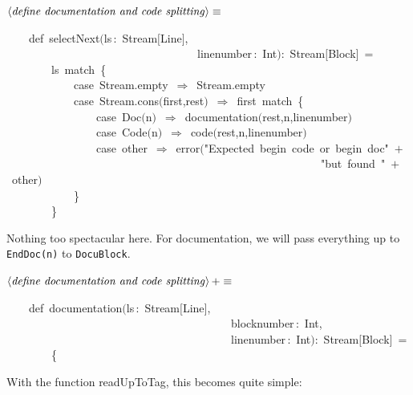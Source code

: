 \documentclass[a4paper,12pt]{article}
\begin{document}
$\left<\mbox{\emph{define documentation and code splitting}}\right>\equiv$
\begin{program}~~~~{\vem def}~selectNext$($ls\,{\rm :}~Stream$[$Line$]$,
\\~~~~~~~~~~~~~~~~~~~~~~~~~~~~~~~~~~linenumber\,{\rm :}~Int$)${\rm :}~Stream$[$Block$]$~=
\\~~~~~~~~ls~{\vem match}~{\small\{}
\\~~~~~~~~~~~~{\vem case}~Stream.empty~$\Rightarrow$~Stream.empty
\\~~~~~~~~~~~~{\vem case}~Stream.cons$($first,rest$)$~$\Rightarrow$~first~{\vem match}~{\small\{}
\\~~~~~~~~~~~~~~~~{\vem case}~Doc$($n$)$~$\Rightarrow$~documentation$($rest,n,linenumber$)$
\\~~~~~~~~~~~~~~~~{\vem case}~Code$($n$)$~$\Rightarrow$~code$($rest,n,linenumber$)$
\\~~~~~~~~~~~~~~~~{\vem case}~other~$\Rightarrow$~error$($"Expected~begin~code~or~begin~doc"~$+$
\\~~~~~~~~~~~~~~~~~~~~~~~~~~~~~~~~~~~~~~~~~~~~~~~~~~~~~~~~"but~found~"~$+$~other$)$
\\~~~~~~~~~~~~{\small\}}
\\~~~~~~~~{\small\}}
\\[0.5em]\end{program}
Nothing too spectacular here. For documentation, we will pass everything
up to \texttt{EndDoc(n)} to \texttt{DocuBlock}.

$\left<\mbox{\emph{define documentation and code splitting}}\right>+\equiv$
\begin{program}~~~~{\vem def}~documentation$($ls\,{\rm :}~Stream$[$Line$]$,
\\~~~~~~~~~~~~~~~~~~~~~~~~~~~~~~~~~~~~~~~~blocknumber\,{\rm :}~Int,
\\~~~~~~~~~~~~~~~~~~~~~~~~~~~~~~~~~~~~~~~~linenumber\,{\rm :}~Int$)${\rm :}~Stream$[$Block$]$~=
\\~~~~~~~~{\small\{}
\\[0.5em]\end{program}
With the function readUpToTag, this becomes quite simple:
\end{document}
